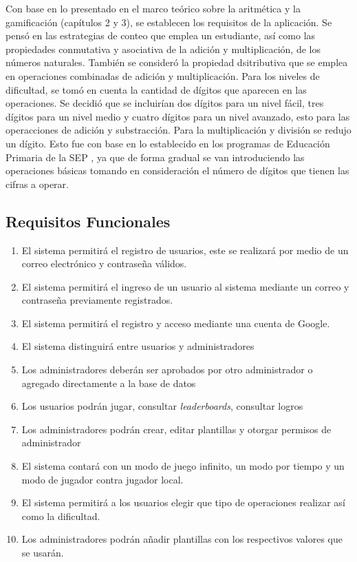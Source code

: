 \documentclass{article}
\begin{document}
Con base en lo presentado en el marco teórico sobre la aritmética y la gamificación (capítulos 2 y 3), se establecen los requisitos de la aplicación.  Se pensó en las estrategias de conteo que emplea un estudiante, así como las propiedades conmutativa y asociativa de la adición y multiplicación, de los números naturales. También se consideró la propiedad dsitributiva que se emplea en operaciones combinadas de adición y multiplicación. Para los niveles de dificultad, se tomó en cuenta la cantidad de dígitos que aparecen en las operaciones. Se decidió que se incluirían dos dígitos para un  nivel fácil, tres dígitos para un nivel medio y cuatro dígitos para un nivel avanzado, esto para las operacciones de adición y substracción. Para la multiplicación y división se redujo un dígito. Esto fue con base en lo establecido en los programas de Educación Primaria de la SEP \cite{aprendizajes2018clave}, ya que de forma gradual se van introduciendo las operaciones básicas tomando en consideración el número de dígitos que tienen las cifras a operar.


\subsection{Requisitos Funcionales}
\begin{enumerate}
\item {El sistema permitirá el registro de usuarios, este se realizará por medio de un correo electrónico y contraseña válidos.}
\item{El sistema permitirá el ingreso de un usuario al sistema mediante un correo y contraseña  previamente registrados.}
\item {El sistema permitirá el registro y acceso mediante una cuenta de Google.}
\item{El sistema distinguirá entre usuarios y administradores}
\item{Los administradores deberán ser aprobados por otro administrador o agregado directamente a la base de datos}
\item{Los usuarios podrán jugar, consultar \emph{leaderboards}, consultar logros}
\item{Los administradores podrán crear, editar plantillas y otorgar permisos de administrador}
\item {El sistema contará con un modo de juego infinito, un modo por tiempo y un modo de jugador contra jugador local.}
\item{El sistema permitirá a los usuarios elegir que tipo de operaciones realizar así como la dificultad.}
\item{Los administradores podrán añadir plantillas con los respectivos valores que se usarán.}
\end{enumerate}
\end{document}
